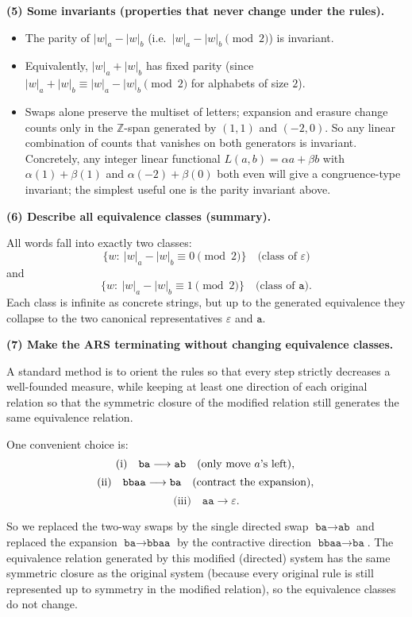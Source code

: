 \documentclass[12pt]{article}
\begin{document}
\textbf{(5) Some invariants (properties that never change under the rules).}

\begin{itemize}
  \item The parity of \( |w|_a-|w|_b \) (i.e.\ \( |w|_a-|w|_b \pmod{2}\)) is invariant.
  \item Equivalently, \(|w|_a+|w|_b\) has fixed parity (since \(|w|_a+|w|_b \equiv |w|_a-|w|_b \pmod{2}\) for alphabets of size \(2\)).
  \item Swaps alone preserve the multiset of letters; expansion and erasure change counts only in the \(\mathbb{Z}\)-span generated by \((1,1)\) and \((-2,0)\). So any linear combination of counts that vanishes on both generators is invariant. Concretely, any integer linear functional \(L(a,b)=\alpha a+\beta b\) with \(\alpha(1)+\beta(1)\) and \(\alpha(-2)+\beta(0)\) both even will give a congruence-type invariant; the simplest useful one is the parity invariant above.
\end{itemize}

\bigskip

\textbf{(6) Describe all equivalence classes (summary).}

All words fall into exactly two classes:
\[
\{w:\ |w|_a-|w|_b \equiv 0\pmod{2}\}\quad\text{(class of }\varepsilon\text{)}
\]
and
\[
\{w:\ |w|_a-|w|_b \equiv 1\pmod{2}\}\quad\text{(class of }\texttt{a}\text{)}.
\]
Each class is infinite as concrete strings, but up to the generated equivalence they collapse to the two canonical representatives \(\varepsilon\) and \(\texttt{a}\).

\bigskip

\textbf{(7) Make the ARS terminating without changing equivalence classes.}

A standard method is to orient the rules so that every step strictly decreases a well-founded measure, while keeping at least one direction of each original relation so that the symmetric closure of the modified relation still generates the same equivalence relation.

One convenient choice is:
\[
\text{(i)}\quad \texttt{ba}\longrightarrow\texttt{ab}\quad(\text{only move }a\text{'s left}),\\
\]
\[
\text{(ii)}\quad \texttt{bbaa}\longrightarrow\texttt{ba}\quad(\text{contract the expansion}),\\
\]
\[
\text{(iii)}\quad \texttt{aa}\longrightarrow\varepsilon.
\]

So we replaced the two-way swaps by the single directed swap \(\texttt{ba}\to\texttt{ab}\) and replaced the expansion \(\texttt{ba}\to\texttt{bbaa}\) by the contractive direction \( \texttt{bbaa}\to\texttt{ba}\). The equivalence relation generated by this modified (directed) system has the same symmetric closure as the original system (because every original rule is still represented up to symmetry in the modified relation), so the equivalence classes do not change.
\end{document}
